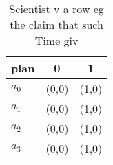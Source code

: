 \documentclass[a4paper]{article}
\begin{document}
\begin{table}
\begin{adjustbox}{width=0.5\columnwidth}
\begin{tabular}{|l|l|l|}
\hline
\textbf{plan} & \multicolumn{1}{c|}{\textbf{0}} & \multicolumn{1}{c|}{\textbf{1}} \\ \hline
\textbf{$a_0$}  & (0,0) & (1,0) \\ \hline
\textbf{$a_1$}  & (0,0) & (1,0) \\ \hline
\textbf{$a_2$}  & (0,0) & (1,0) \\ \hline
\textbf{$a_3$}  & (0,0) & (1,0) \\ \hline
\end{tabular}
\end{adjustbox}
\caption{Scientist v a row eg the claim that such Time giv
}
\end{table}
\end{document}
